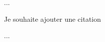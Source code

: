 \usepackage[french]{babel} %

\usepackage[sorting=none]{biblatex} %



...

Je souhaite ajouter une citation \cite{latex2e}

...

\printbibliography
